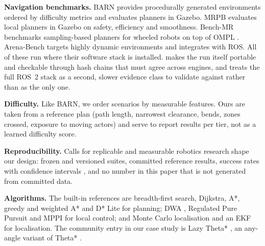 \textbf{Navigation benchmarks.} BARN \cite{perille2020barn} provides procedurally generated
environments ordered by difficulty metrics and evaluates planners in Gazebo. MRPB
\cite{wen2020mrpb} evaluates local planners in Gazebo on safety, efficiency and smoothness.
Bench-MR \cite{heiden2021benchmr} benchmarks sampling-based planners for wheeled robots on top of
OMPL \cite{sucan2012ompl}. Arena-Bench \cite{kastner2022arenabench} targets highly dynamic
environments and integrates with ROS. All of these run where their software stack is installed.
\bench{} makes the run itself portable and checkable through hash chains that must agree across
engines, and treats the full ROS~2 stack as a second, slower evidence class to validate against
rather than as the only one.

\textbf{Difficulty.} Like BARN, we order scenarios by measurable features. Ours are taken from a
reference plan (path length, narrowest clearance, bends, zones crossed, exposure to moving actors)
and serve to report results per tier, not as a learned difficulty score.

\textbf{Reproducibility.} Calls for replicable and measurable robotics research
\cite{bonsignorio2015replicable} shape our design: frozen and versioned suites, committed reference
results, success rates with confidence intervals \cite{wilson1927}, and no number in this paper that
is not generated from committed data.

\textbf{Algorithms.} The built-in references are breadth-first search, Dijkstra, A*, greedy and
weighted A* and D* Lite \cite{koenig2002dstarlite} for planning; DWA \cite{fox1997dwa}, Regulated
Pure Pursuit \cite{macenski2023rpp} and MPPI \cite{williams2017mppi} for local control; and Monte
Carlo localisation \cite{fox1999mcl} and an EKF for localisation. The community entry in our case
study is Lazy Theta* \cite{nash2010lazytheta}, an any-angle variant of Theta* \cite{nash2007theta}.
